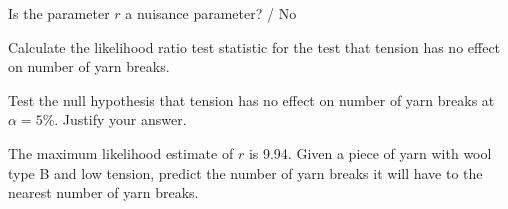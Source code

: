 \documentclass[12pt]{article}
\begin{document}
\begin{enumerate}[(a)]

 Is the parameter $r$ a nuisance parameter?  / No 

 Calculate the likelihood ratio test statistic for the test that tension has no effect on number of yarn breaks. \\


 Test the null hypothesis that tension has no effect on number of yarn breaks at $\alpha=5\%$. Justify your answer.  \\




 The maximum likelihood estimate of $r$ is 9.94. Given a piece of yarn with wool type B and low tension, predict the number of yarn breaks it will have to the nearest number of yarn breaks.   \\



\end{enumerate}
\end{document}
